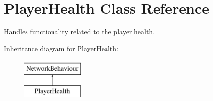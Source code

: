 \hypertarget{class_player_health}{}\section{Player\+Health Class Reference}
\label{class_player_health}


Handles functionality related to the player health.  


Inheritance diagram for Player\+Health\+:\begin{figure}[H]
\begin{center}
\leavevmode
\includegraphics[height=2.000000cm]{class_player_health}
\end{center}
\end{figure}

